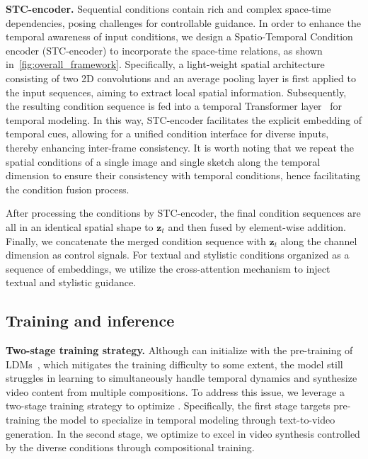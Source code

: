 \textbf{STC-encoder.}
Sequential conditions contain rich and complex space-time dependencies, posing challenges for controllable guidance.
In order to enhance the temporal awareness of input conditions, we design a Spatio-Temporal Condition encoder (STC-encoder) to incorporate the space-time relations, as shown in~\cref{fig:overall_framework}.  %
Specifically, a light-weight spatial architecture consisting of two 2D convolutions and an average pooling layer is first applied to the input sequences, aiming to extract local spatial information.
Subsequently, the resulting condition sequence is fed into a temporal Transformer layer~\cite{vaswani2017Transformer} for temporal modeling.
In this way, STC-encoder facilitates the explicit embedding of temporal cues, allowing for a unified condition interface for diverse inputs, thereby enhancing inter-frame consistency.
It is worth noting that we repeat the spatial conditions of a single image and single sketch along the temporal dimension to ensure their consistency with temporal conditions, hence facilitating the condition fusion process.

After processing the conditions by STC-encoder, the final condition sequences are all in an identical spatial shape to $\bm{z}_t$ and then fused by element-wise addition.
Finally, we concatenate the merged condition sequence with $\bm{z}_t$ along the channel dimension as control signals.
For textual and stylistic conditions organized as a sequence of embeddings, we utilize the cross-attention mechanism to inject textual and stylistic guidance.

\subsection{Training and inference}
\textbf{Two-stage training strategy.} 
Although \method can initialize with the pre-training of LDMs~\cite{rombach2022LDM}, which mitigates the training difficulty to some extent, the model still struggles in learning to simultaneously handle temporal dynamics and synthesize video content from multiple compositions.
To address this issue, we leverage a two-stage training strategy to optimize \method.
Specifically, the first stage targets pre-training the model to specialize in temporal modeling through text-to-video generation. 
In the second stage, we optimize \method to excel in video synthesis controlled by the diverse conditions through compositional training.

